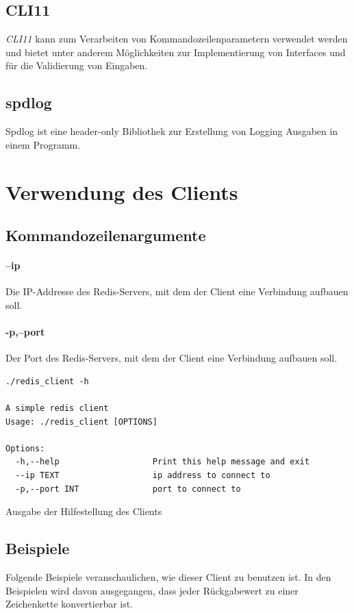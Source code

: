 \documentclass[12pt, letterpaper]{article}
\newenvironment{code}{\captionsetup{type=listing}}{}
\begin{document}
\subsection{CLI11}
\textit{CLI11}\cite{cli11} kann zum Verarbeiten von Kommandozeilenparametern verwendet werden und bietet unter anderem Möglichkeiten zur Implementierung von Interfaces und für die Validierung von Eingaben.

\subsection{spdlog}
Spdlog ist eine header-only Bibliothek zur Erstellung von Logging Ausgaben in einem Programm.

\section{Verwendung des Clients}
\label{usage}

\subsection{Kommandozeilenargumente}

\paragraph{--ip}
Die IP-Addresse des Redis-Servers, mit dem der Client eine Verbindung aufbauen soll.

\paragraph{-p,--port}
Der Port des Redis-Servers, mit dem der Client eine Verbindung aufbauen soll.


\begin{code}
  \begin{verbatim}
./redis_client -h

A simple redis client
Usage: ./redis_client [OPTIONS]

Options:
  -h,--help                   Print this help message and exit
  --ip TEXT                   ip address to connect to
  -p,--port INT               port to connect to
  \end{verbatim}
  \caption{Ausgabe der Hilfestellung des Clients}
\end{code}

\subsection{Beispiele}
Folgende Beispiele veranschaulichen, wie dieser Client zu benutzen ist. In den Beispielen wird davon ausgegangen, dass jeder Rückgabewert zu einer Zeichenkette konvertierbar ist. 
\end{document}
